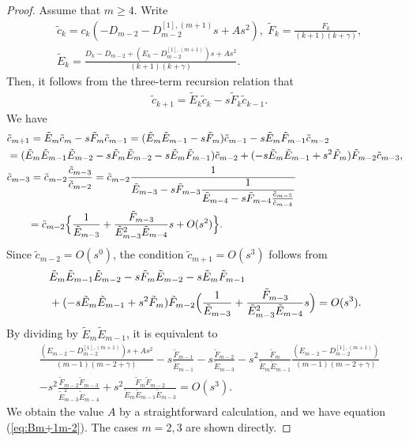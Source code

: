 \documentclass[12pt]{amsart}
\numberwithin{equation}{section}
\theoremstyle{definition}
\theoremstyle{remark}
\begin{document}
\begin{proof}
Assume that $m \geq 4$.
Write
\begin{align}
& \tilde{c}_k = c_{k} (-D_{m-2} - D_{m-2}^{[1],(m+1)} s +A s^2 ) , \; \tilde{F}_k = \frac{F_k }{(k+1)(k+\gamma )} , \\
& \tilde{E}_k = \frac{D_k -D_{m-2} +  (E_k - D_{m-2}^{[1],(m+1)}) s +A s^2 }{(k+1)(k+\gamma )}  . \nonumber
\end{align}
Then, it follows from the three-term recursion relation that
\begin{align}
& \tilde{c}_{k+1} = \tilde{E}_{k} \tilde{c}_{k} - s \tilde{F}_{k} \tilde{c}_{k-1} .
\end{align}
We have
\begin{align}
& \tilde{c}_{m+1} = \tilde{E}_m \tilde{c}_{m} - s \tilde{F}_m \tilde{c}_{m-1} 
 = ( \tilde{E}_m \tilde{E}_{m-1} - s \tilde{F}_m  ) \tilde{c}_{m-1} - s \tilde{E}_m \tilde{F}_{m-1} \tilde{c}_{m-2} \\
& = ( \tilde{E}_m \tilde{E}_{m-1} \tilde{E}_{m-2} -s  \tilde{F}_m   \tilde{E}_{m-2} -s  \tilde{E}_m \tilde{F}_{m-1} ) \tilde{c}_{m-2} + ( - s \tilde{E}_m \tilde{E}_{m-1} + s^2  \tilde{F}_m  ) \tilde{F}_{m-2} \tilde{c}_{m-3} , \nonumber \\
& \tilde{c}_{m-3} = \tilde{c}_{m-2} \frac{\tilde{c}_{m-3}}{\tilde{c}_{m-2}}  = \tilde{c}_{m-2} \frac{1}{\displaystyle \tilde{E}_{m-3}  -s  \tilde{F}_{m-3} \frac{1}{\tilde{E}_{m-4} -s  \tilde{F}_{m-4} \frac{\tilde{c}_{m-5}}{\tilde{c}_{m-4}} } } \nonumber \\
& \qquad = \tilde{c}_{m-2} \Bigl\{ \frac{1}{\tilde{E}_{m-3}} + \frac{\tilde{F}_{m-3}}{\tilde{E}_{m-3}^2\tilde{E}_{m-4}} s +O(s^2)  \Bigr\} . \nonumber 
\end{align}
Since $ \tilde{c}_{m-2} = O(s^0)$, the condition $\tilde{c}_{m+1} = O(s^3)  $ follows from
\begin{align}
& \tilde{E}_m \tilde{E}_{m-1} \tilde{E}_{m-2} -s  \tilde{F}_m   \tilde{E}_{m-2} -s  \tilde{E}_m \tilde{F}_{m-1} \\
&  + ( - s \tilde{E}_m \tilde{E}_{m-1} + s^2  \tilde{F}_m  ) \tilde{F}_{m-2} \Bigl( \frac{1}{\tilde{E}_{m-3}} + \frac{\tilde{F}_{m-3}}{\tilde{E}_{m-3}^2\tilde{E}_{m-4}} s  \Bigr) = O(s^3) . \nonumber
\end{align}
By dividing by $\tilde{E}_m \tilde{E}_{m-1} $, it is equivalent to
\begin{align}
& \frac{(E_{m-2} - D_{m-2}^{[1],(m+1)}) s +A s^2}{(m-1)(m-2+\gamma )} -s \frac{\tilde{F}_{m-1}}{ \tilde{E}_{m-1}} - s \frac{\tilde{F}_{m-2} }{\tilde{E}_{m-3}}  -s^2  \frac{\tilde{F}_m  }{ \tilde{E}_m \tilde{E}_{m-1}}  \frac{ (E_{m-2} - D_{m-2}^{[1],(m+1)}) }{(m-1)(m-2+\gamma )} \\
& - s^2 \frac{\tilde{F}_{m-2} \tilde{F}_{m-3}}{\tilde{E}_{m-3}^2\tilde{E}_{m-4}} + s^2 \frac{\tilde{F}_m \tilde{F}_{m-2} }{ \tilde{E}_m \tilde{E}_{m-1} \tilde{E}_{m-3}} = O(s^3) . \nonumber 
\end{align}
We obtain the value $A$ by a straightforward calculation, and we have equation (\ref{eq:Bm+1m-2}).
The cases $m=2,3$ are shown directly.
\end{proof}
\end{document}
